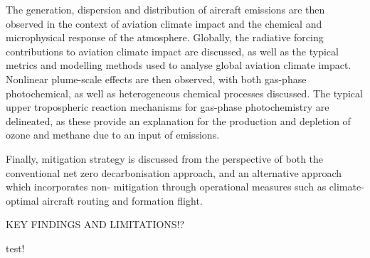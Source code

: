 The generation, dispersion and distribution of aircraft emissions are then observed in the context of aviation climate impact and the chemical and microphysical response of the atmosphere. Globally, the radiative forcing contributions to aviation climate impact are discussed, as well as the typical metrics and modelling methods used to analyse global aviation climate impact. Nonlinear plume-scale effects are then observed, with both gas-phase photochemical, as well as heterogeneous chemical processes discussed. The typical upper tropospheric reaction mechanisms for gas-phase photochemistry are delineated, as these provide an explanation for the production and depletion of ozone and methane due to an input of  emissions.

Finally, mitigation strategy is discussed from the perspective of both the conventional net zero decarbonisation approach, and an alternative approach which incorporates non- mitigation through operational measures such as climate-optimal aircraft routing and formation flight. 

KEY FINDINGS AND LIMITATIONS!?

test!




